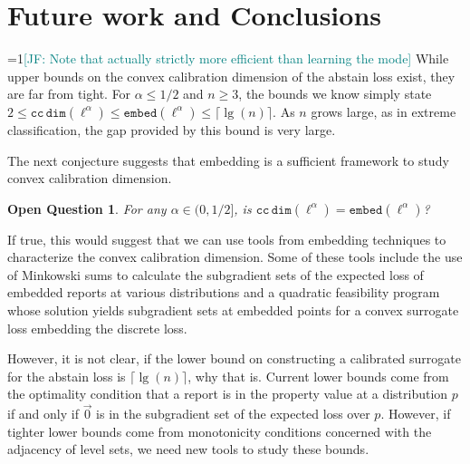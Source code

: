 \documentclass[anon,12pt]{colt2021} %
\newcommand{\Comments}{1}
\newcommand{\mynote}[2]{\ifnum\Comments=1\textcolor{#1}{#2}\fi}
\newcommand{\jessie}[1]{\mynote{teal}{[JF: #1]}}
\newcommand{\ccdim}{\mathtt{cc\,dim}}
\newcommand{\embed}{\mathtt{embed}}
\newtheorem{openq}{Open Question}
\begin{document}
\section{Future work and Conclusions}
\jessie{Note that actually strictly more efficient than learning the mode}
While upper bounds on the convex calibration dimension of the abstain loss exist, they are far from tight.
For $\alpha \leq 1/2$ and $n \geq 3$, the bounds we know simply state $2 \leq \ccdim(\ell^\alpha) \leq \embed(\ell^\alpha) \leq \lceil \lg(n) \rceil$.
As $n$ grows large, as in extreme classification, the gap provided by this bound is very large.

The next conjecture suggests that embedding is a sufficient framework to study convex calibration dimension.
\begin{openq}
	For any $\alpha \in (0,1/2]$, is $\ccdim(\ell^\alpha) = \embed(\ell^\alpha)$?
\end{openq}

If true, this would suggest that we can use tools from embedding techniques to characterize the convex calibration dimension.
Some of these tools include the use of Minkowski sums to calculate the subgradient sets of the expected loss of embedded reports at various distributions and a quadratic feasibility program whose solution yields subgradient sets at embedded points for a convex surrogate loss embedding the discrete loss.

However, it is not clear, if the lower bound on constructing a calibrated surrogate for the abstain loss is $\lceil \lg(n) \rceil$, why that is.
Current lower bounds come from the optimality condition that a report is in the property value at a distribution $p$ if and only if $\vec 0$ is in the subgradient set of the expected loss over $p$.
However, if tighter lower bounds come from monotonicity conditions concerned with the adjacency of level sets, we need new tools to study these bounds.


\newpage


\end{document}
